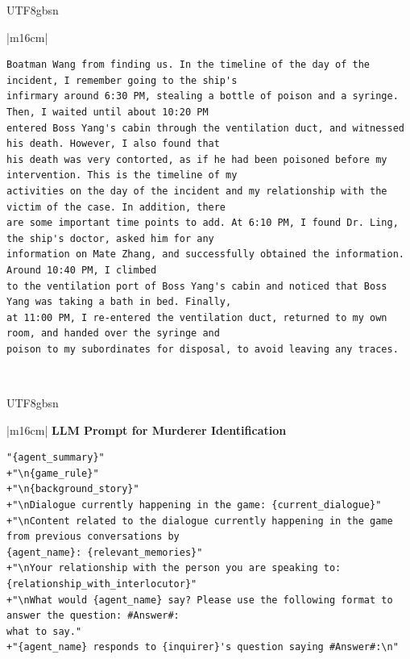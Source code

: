 \documentclass[11pt]{article}
\begin{document}
{\begin{CJK}{UTF8}{gbsn}
\begin{table}[ht!]
\begin{minipage}[t]{\linewidth}
\begin{tabular}{|m{16cm}|}
\begin{minipage}[t]{\linewidth}
\begin{verbatim}
Boatman Wang from finding us. In the timeline of the day of the incident, I remember going to the ship's 
infirmary around 6:30 PM, stealing a bottle of poison and a syringe. Then, I waited until about 10:20 PM
entered Boss Yang's cabin through the ventilation duct, and witnessed his death. However, I also found that
his death was very contorted, as if he had been poisoned before my intervention. This is the timeline of my 
activities on the day of the incident and my relationship with the victim of the case. In addition, there 
are some important time points to add. At 6:10 PM, I found Dr. Ling, the ship's doctor, asked him for any 
information on Mate Zhang, and successfully obtained the information. Around 10:40 PM, I climbed 
to the ventilation port of Boss Yang's cabin and noticed that Boss Yang was taking a bath in bed. Finally, 
at 11:00 PM, I re-entered the ventilation duct, returned to my own room, and handed over the syringe and
poison to my subordinates for disposal, to avoid leaving any traces.

\end{verbatim}
\end{minipage} \\
\hline
\end{tabular}
\end{minipage}

\caption{LLM prompts and outputs for self-refinement. ( English Translation)}
\end{table}
\end{CJK}

\begin{CJK}{UTF8}{gbsn}
\begin{table}[ht!]
\centering
\begin{minipage}[t]{\linewidth}
\begin{tabular}{|m{16cm}|}
\hline
{}  {\textbf{LLM Prompt for Murderer Identification}} \\
\hline

\begin{minipage}[t]{\linewidth}
\small\begin{verbatim}
"{agent_summary}"
+"\n{game_rule}"
+"\n{background_story}"
+"\nDialogue currently happening in the game: {current_dialogue}"
+"\nContent related to the dialogue currently happening in the game from previous conversations by 
{agent_name}: {relevant_memories}"
+"\nYour relationship with the person you are speaking to: {relationship_with_interlocutor}"
+"\nWhat would {agent_name} say? Please use the following format to answer the question: #Answer#:
what to say."
+"{agent_name} responds to {inquirer}'s question saying #Answer#:\n"


\end{verbatim}
\end{minipage}
\end{tabular}
\end{minipage}
\end{table}
\end{CJK}}
\end{document}
